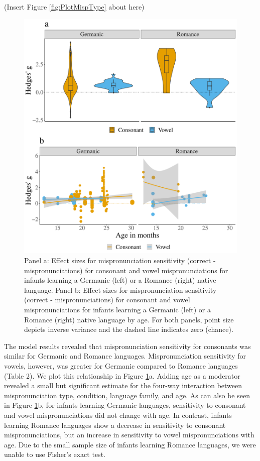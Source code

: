\documentclass[man, noextraspace]{apa6}
\begin{document}
(Insert Figure \ref{fig:PlotMispType} about here)

\begin{figure}
\centering
\includegraphics{VonHolzenBergmann_MPMetaAnalysis_files/figure-latex/PlotCVEffectLang-1.pdf}
\caption{\label{fig:PlotCVEffectLang}Panel a: Effect sizes for mispronunciation sensitivity (correct - mispronunciations) for consonant and vowel mispronunciations for infants learning a Germanic (left) or a Romance (right) native language. Panel b: Effect sizes for mispronunciation sensitivity (correct - mispronunciations) for consonant and vowel mispronunciations for infants learning a Germanic (left) or a Romance (right) native language by age. For both panels, point size depicts inverse variance and the dashed line indicates zero (chance).}
\end{figure}

The model results revealed that mispronunciation sensitivity for consonants was similar for Germanic and Romance languages. Mispronunciation sensitivity for vowels, however, was greater for Germanic compared to Romance languages (Table 2). We plot this relationship in Figure \ref{fig:PlotCVEffectLang}a. Adding age as a moderator revealed a small but significant estimate for the four-way interaction between mispronunciation type, condition, language family, and age. As can also be seen in Figure \ref{fig:PlotCVEffectLang}b, for infants learning Germanic languages, sensitivity to consonant and vowel mispronunciations did not change with age. In contrast, infants learning Romance languages show a decrease in sensitivity to consonant mispronunciations, but an increase in sensitivity to vowel mispronunciations with age. Due to the small sample size of infants learning Romance languages, we were unable to use Fisher's exact test.
\end{document}
